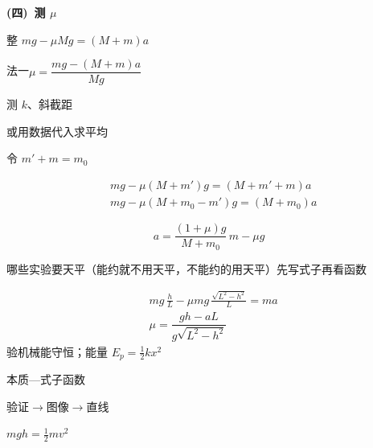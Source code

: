 \textbf{(四)\ 测 $\mu$}


整 $mg-\mu Mg=(M+m)a$ %

法一\quad $\mu=\dfrac{mg-(M+m)a}{Mg}$


测 $k$、斜截距  %

或用数据代入求平均

令 $m'+m=m_0$

\begin{align*}
& mg-\mu(M+m')g=(M+m'+m)a \\
& mg-\mu(M+m_0-m')g=(M+m_0)a %
\end{align*}

\[
a=\dfrac{(1+\mu)g}{M+m_0}\,m-\mu g %
\]

哪些实验要天平（能约就不用天平，不能约的用天平）\qquad 先写式子再看函数


\begin{align*}
& mg\,\frac{h}{L}-\mu mg\,\frac{\sqrt{L^2-h^2}}{L}=ma \\
& \mu=\dfrac{gh-aL}{g\sqrt{L^2-h^2}}
\end{align*}
验机械能守恒；能量 $E_p=\frac{1}{2}kx^2$

\hspace{2em}本质—式子函数

\hspace{2em}验证$\to$图像$\to$直线

$mgh=\frac{1}{2}mv^2$

